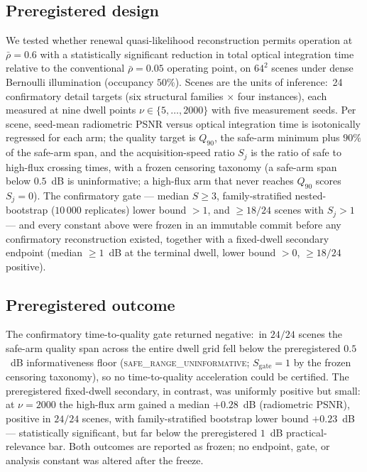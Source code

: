\documentclass[10pt,twocolumn]{article}
\newcommand{\rhobar}{\bar{\rho}}
\begin{document}
\subsection{Preregistered design}
We tested whether renewal quasi-likelihood reconstruction permits operation
at $\rhobar = 0.6$ with a statistically significant reduction in total
optical integration time relative to the conventional $\rhobar = 0.05$
operating point, on $64^{2}$ scenes under dense Bernoulli illumination
(occupancy $50\%$). Scenes are the units of inference:\ 24 confirmatory
detail targets (six structural families $\times$ four instances), each
measured at nine dwell points $\nu \in \{5,\dots,2000\}$ with five
measurement seeds. Per scene, seed-mean radiometric PSNR versus optical
integration time is isotonically regressed for each arm; the quality
target is $Q_{90}$, the safe-arm minimum plus $90\%$ of the safe-arm span,
and the acquisition-speed ratio $S_j$ is the ratio of safe to high-flux
crossing times, with a frozen censoring taxonomy (a safe-arm span below
$0.5$~dB is uninformative; a high-flux arm that never reaches $Q_{90}$
scores $S_j = 0$). The confirmatory gate --- median $S \ge 3$,
family-stratified nested-bootstrap ($10\,000$ replicates) lower bound
$> 1$, and $\ge 18/24$ scenes with $S_j > 1$ --- and every constant above
were frozen in an immutable commit before any confirmatory reconstruction
existed, together with a fixed-dwell secondary endpoint (median
$\ge 1$~dB at the terminal dwell, lower bound $> 0$, $\ge 18/24$
positive).

\subsection{Preregistered outcome}
The confirmatory time-to-quality gate returned negative:\ in $24/24$ scenes
the safe-arm quality span across the entire dwell grid fell below the
preregistered $0.5$~dB informativeness floor
(\textsc{safe\_range\_uninformative}; $S_{\mathrm{gate}} = 1$ by the frozen
censoring taxonomy), so no time-to-quality acceleration could be certified.
The preregistered fixed-dwell secondary, in contrast, was uniformly
positive but small: at $\nu = 2000$ the high-flux arm gained a median
$+0.28$~dB (radiometric PSNR), positive in $24/24$ scenes, with
family-stratified bootstrap lower bound $+0.23$~dB --- statistically
significant, but far below the preregistered $1$~dB practical-relevance
bar. Both outcomes are reported as frozen; no endpoint, gate, or analysis
constant was altered after the freeze.
\end{document}

